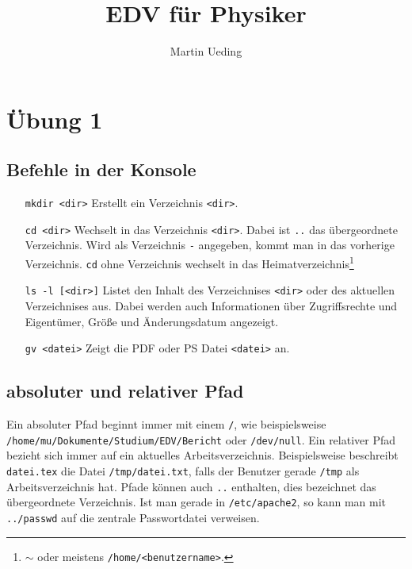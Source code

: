 \documentclass[12pt]{article}
\title{EDV für Physiker}
\author{Martin Ueding}
\begin{document}
\maketitle

\tableofcontents
\newpage

\section{Übung 1}

\subsection{Befehle in der Konsole}

\begin{itemize}

\item[\texttt{mkdir <dir>}] Erstellt ein Verzeichnis \texttt{<dir>}.
\item[\texttt{cd <dir>}] Wechselt in das Verzeichnis \texttt{<dir>}. Dabei ist \texttt{..} das übergeordnete Verzeichnis. Wird als Verzeichnis \texttt{-} angegeben, kommt man in das vorherige Verzeichnis. \texttt{cd} ohne Verzeichnis wechselt in das Heimatverzeichnis\footnote{\texttt{$\sim$} oder meistens \texttt{/home/<benutzername>}.}
\item[\texttt{ls -l [<dir>]}] Listet den Inhalt des Verzeichnises \texttt{<dir>} oder des aktuellen Verzeichnises aus. Dabei werden auch Informationen über Zugriffsrechte und Eigentümer, Größe und Änderungsdatum angezeigt.
\item[\texttt{gv <datei>}] Zeigt die PDF oder PS Datei \texttt{<datei>} an.
\end{itemize}

\subsection{absoluter und relativer Pfad}

Ein absoluter Pfad beginnt immer mit einem \texttt{/}, wie beispielsweise \\ \texttt{/home/mu/Dokumente/Studium/EDV/Bericht} oder \texttt{/dev/null}. Ein relativer Pfad bezieht sich immer auf ein aktuelles Arbeitsverzeichnis. Beispielsweise beschreibt \texttt{datei.tex} die Datei \texttt{/tmp/datei.txt}, falls der Benutzer gerade \texttt{/tmp} als Arbeitsverzeichnis hat. Pfade können auch \texttt{..} enthalten, dies bezeichnet das übergeordnete Verzeichnis. Ist man gerade in \texttt{/etc/apache2}, so kann man mit \texttt{../passwd} auf die zentrale Passwortdatei verweisen.
\end{document}
